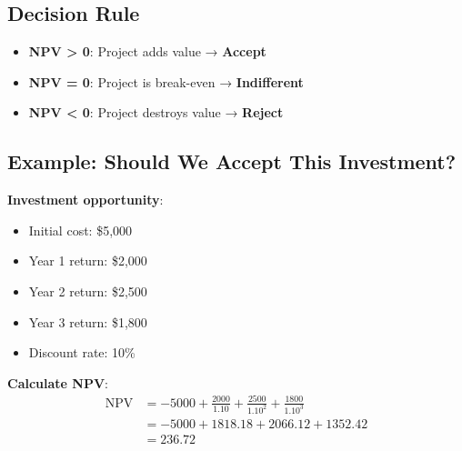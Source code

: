 \documentclass[
  letterpaper,
]{scrbook}
\providecommand{\tightlist}{%
  \setlength{\itemsep}{0pt}\setlength{\parskip}{0pt}}
\begin{document}
\subsection{Decision Rule}\label{decision-rule}

\begin{tcolorbox}[enhanced jigsaw, toptitle=1mm, colbacktitle=quarto-callout-important-color!10!white, opacityback=0, leftrule=.75mm, breakable, colframe=quarto-callout-important-color-frame, toprule=.15mm, opacitybacktitle=0.6, coltitle=black, bottomrule=.15mm, colback=white, arc=.35mm, titlerule=0mm, rightrule=.15mm, left=2mm, title=\textcolor{quarto-callout-important-color}{\faExclamation}\hspace{0.5em}{NPV Decision Rule}, bottomtitle=1mm]

\begin{itemize}
\tightlist
\item
  \textbf{NPV \textgreater{} 0}: Project adds value → \textbf{Accept}
\item
  \textbf{NPV = 0}: Project is break-even → \textbf{Indifferent}
\item
  \textbf{NPV \textless{} 0}: Project destroys value → \textbf{Reject}
\end{itemize}

\end{tcolorbox}

\subsection{Example: Should We Accept This
Investment?}\label{example-should-we-accept-this-investment}

\textbf{Investment opportunity}:

\begin{itemize}
\tightlist
\item
  Initial cost: \$5,000
\item
  Year 1 return: \$2,000
\item
  Year 2 return: \$2,500
\item
  Year 3 return: \$1,800
\item
  Discount rate: 10\%
\end{itemize}

\textbf{Calculate NPV}: \[
\begin{aligned}
\text{NPV} &= -5000 + \frac{2000}{1.10} + \frac{2500}{1.10^2} + \frac{1800}{1.10^3} \\
&= -5000 + 1818.18 + 2066.12 + 1352.42 \\
&= 236.72
\end{aligned}
\]
\end{document}
